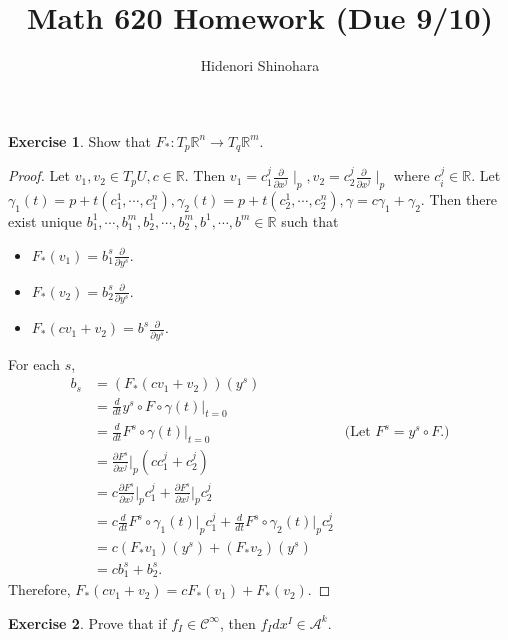 \documentclass[12pt, psamsfonts]{amsart}
\theoremstyle{definition}
\newtheorem*{exer}{Exercise}
\theoremstyle{remark}
\numberwithin{equation}{section}
\begin{document}
\title{Math 620 Homework (Due 9/10)}
\author{Hidenori Shinohara}
\maketitle

\begin{exer}
  Show that $F_*: T_p\mathbb{R}^n \rightarrow T_q\mathbb{R}^m$.
\end{exer}

\begin{proof}
  Let $v_1, v_2 \in T_pU, c \in \mathbb{R}$.
  Then $v_1 = c_1^j\frac{\partial}{\partial x^j} \mid_p, v_2 = c_2^j\frac{\partial}{\partial x^j} \mid_p$ where $c_i^j \in \mathbb{R}$.
  Let $\gamma_1(t) = p + t(c_1^1, \cdots, c_1^n), \gamma_2(t) = p + t(c_2^1, \cdots, c_2^n), \gamma = c\gamma_1 + \gamma_2$.
  Then there exist unique $b_1^1, \cdots, b_1^m, b_2^1, \cdots, b_2^m, b^1, \cdots, b^m \in \mathbb{R}$ such that
  \begin{itemize}
    \item
      $F_*(v_1) = b_1^s\frac{\partial}{\partial y^s}$.
    \item
      $F_*(v_2) = b_2^s\frac{\partial}{\partial y^s}$.
    \item
      $F_*(cv_1 + v_2) = b^s\frac{\partial}{\partial y^s}$.
  \end{itemize}
  For each $s$,
  \begin{align*}
    b_s
      &= (F_*(cv_1 + v_2))(y^s) \\
      &= \frac{d}{dt} y^s \circ F \circ \gamma(t) \Big\vert_{t = 0} \\
      &= \frac{d}{dt} F^s \circ \gamma(t) \Big\vert_{t = 0} & \text{(Let $F^s = y^s \circ F$.)} \\
      &= \frac{\partial F^s}{\partial x^j} \Big\vert_p (cc_1^j + c_2^j) \\
      &= c\frac{\partial F^s}{\partial x^j} \Big\vert_p c_1^j + \frac{\partial F^s}{\partial x^j} \Big\vert_p c_2^j \\
      &= c\frac{d}{dt} F^s \circ \gamma_1(t) \Big\vert_p c_1^j + \frac{d}{dt} F^s \circ \gamma_2(t) \Big\vert_p c_2^j \\
      &= c(F_*v_1)(y^s) + (F_*v_2)(y^s) \\
      &= cb_1^s+ b_2^s.
  \end{align*}
  Therefore, $F_*(cv_1 + v_2) = cF_*(v_1) + F_*(v_2)$.
\end{proof}

\begin{exer}
  Prove that if $f_I \in \mathscr{C}^{\infty}$, then $f_Idx^I \in \mathcal{A}^k$.
\end{exer}
\end{document}
